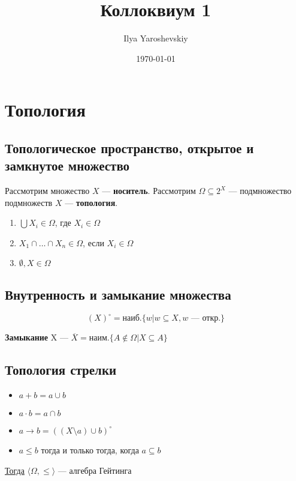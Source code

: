 \documentclass[english]{article}
\author{Ilya Yaroshevskiy}
\date{\today}
\title{Коллоквиум 1}
\begin{document}
\maketitle
\tableofcontents


\section{Топология}
\label{sec:org92a76be}
\subsection{Топологическое пространство, открытое и замкнутое множество}
\label{sec:orgcbeb70d}
\begin{definition}
	Рассмотрим множество \(X\) --- \textbf{носитель}. Рассмотрим \(\Omega \subseteq 2^X\) --- подмножество подмножеств \(X\) --- \textbf{топология}.
	\begin{enumerate}
		\item \(\bigcup X_i \in \Omega\), где \(X_i \in \Omega\)
		\item \(X_1 \cap \dots \cap X_n \in \Omega\), если \(X_i \in \Omega\)
		\item \(\emptyset, X \in \Omega\)
	\end{enumerate}
	\label{orgcbc984d}
\end{definition}
\subsection{Внутренность и замыкание множества}
\label{sec:orga8717b9}
\begin{definition}
	\[ (X)^\circ = \text{наиб.}\{w \big| w \subseteq X, w\text{ --- откр.} \} \]
	\label{org43706fc}
\end{definition}
\begin{definition}
	\textbf{Замыкание} X --- \(\overline{X} = \text{наим.}\{A \not\in \Omega \big| X \subseteq A \}\)
\end{definition}
\subsection{Топология стрелки}
\label{sec:org3f98477}
\begin{theorem}
	\-
	\begin{itemize}
		\item \(a + b = a \cup b\)
		\item \(a \cdot b = a \cap b\)
		\item \(a \to b = \left((X \setminus a) \cup b\right)^\circ\)
		\item \(a \le b\) тогда и только тогда, когда \(a \subseteq b\)
	\end{itemize}
	\uline{Тогда} \(\langle \Omega, \le \rangle\) --- алгебра Гейтинга
	\label{orgc32870c}
\end{theorem}
\end{document}
